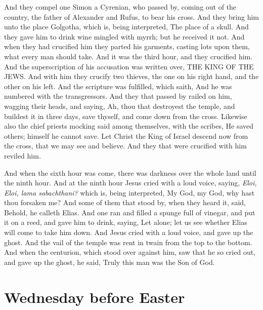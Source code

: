 And they compel one Simon a Cyrenian, who passed by, coming out of the country, the father of Alexander and Rufus, to bear his cross. And they bring him unto the place Golgotha, which is, being interpreted, The place of a skull. And they gave him to drink wine mingled with myrrh; but he received it not. And when they had crucified him they parted his garments, casting lots upon them, what every man should take. And it was the third hour, and they crucified him. And the superscription of his accusation was written over, THE KING OF THE JEWS. And with him they crucify two thieves, the one on his right hand, and the other on his left. And the scripture was fulfilled, which saith, And he was numbered with the transgressors. And they that passed by railed on him, wagging their heads, and saying, Ah, thou that destroyest the temple, and buildest it in three days, save thyself, and come down from the cross. Likewise also the chief priests mocking said among themselves, with the scribes, He saved others; himself he cannot save. Let Christ the King of Israel descend now from the cross, that we may see and believe. And they that were crucified with him reviled him.

And when the sixth hour was come, there was darkness over the whole land until the ninth hour. And at the ninth hour Jesus cried with a loud voice, saying, \emph{Eloi, Eloi, lama sabachthani?} which is, being interpreted, My God, my God, why hast thou forsaken me? And some of them that stood by, when they heard it, said, Behold, he calleth Elias. And one ran and filled a spunge full of vinegar, and put it on a reed, and gave him to drink, saying, Let alone; let us see whether Elias will come to take him down. And Jesus cried with a loud voice, and gave up the ghost. And the vail of the temple was rent in twain from the top to the bottom. And when the centurion, which stood over against him, saw that he so cried out, and gave up the ghost, he said, Truly this man was the Son of God.

\section{Wednesday before Easter}%
\subsection{}  %

